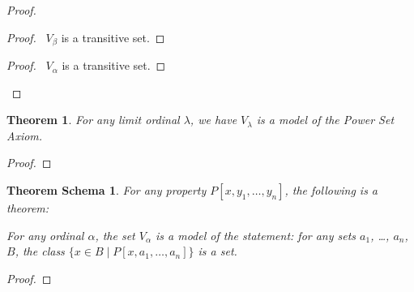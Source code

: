 \documentclass{book}
\let\qed\relax
\newtheorem{thm}[ax]{Theorem}
\newtheorem{thms}[ax]{Theorem Schema}
\theoremstyle{definition}
\begin{document}
\begin{proof}
\pf
{}
\begin{proof}
	\pf\ $V_\beta$ is a transitive set.
\end{proof}
\begin{proof}
	\pf\ $V_\alpha$ is a transitive set.
\end{proof}
\qed 
\end{proof}

\begin{thm}
\label{thm:modelPowerSet}
For any limit ordinal $\lambda$, we have $V_\lambda$ is a model of the Power Set Axiom.
\end{thm}

\begin{proof}
\pf
{}
\qed
\end{proof}

\begin{thms}
\label{thm:modelComprehension}
For any property $P[x,y_1, \ldots, y_n]$, the following is a theorem:

For any ordinal $\alpha$, the set $V_\alpha$ is a model of the statement: for any sets $a_1$, \ldots, $a_n$, $B$, the class $\{ x \in B \mid P[x,a_1, \ldots, a_n] \}$ is a set.
\end{thms}

\begin{proof}
\pf
{}
\qed
\end{proof}
\end{document}
